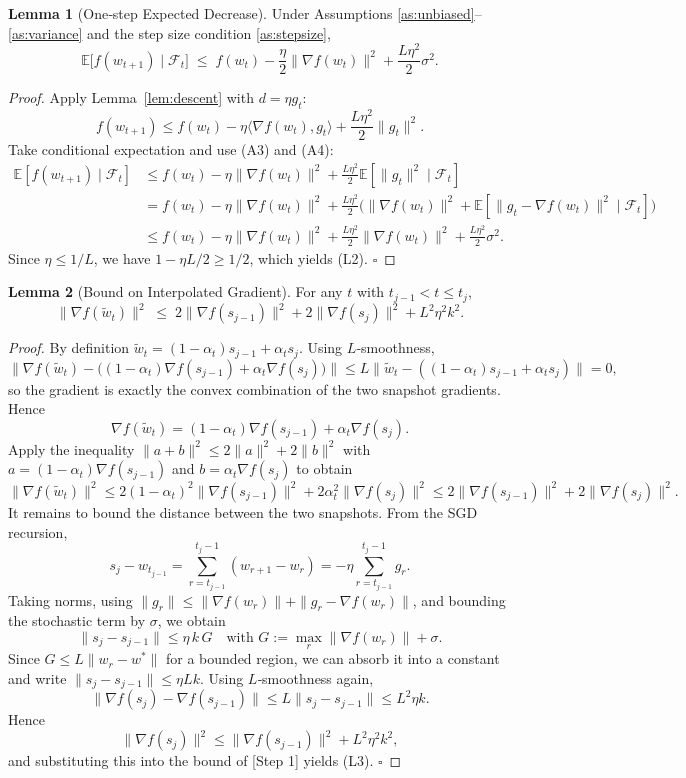 \documentclass{article}
\newcommand{\E}{\mathbb{E}}
\theoremstyle{definition}
\newtheorem{lemma}{Lemma}
\begin{document}
\begin{lemma}[One‑step Expected Decrease]\label{lem:onestep}
Under Assumptions \ref{as:unbiased}–\ref{as:variance} and the step size
condition \ref{as:stepsize},
\[
\E\big[f(w_{t+1})\mid\mathcal{F}_t\big]
\;\le\;
f(w_t)-\frac{\eta}{2}\|\nabla f(w_t)\|^{2}
+\frac{L\eta^{2}}{2}\sigma^{2}.
\tag{L2}
\]
\end{lemma}
\begin{proof}
Apply Lemma~\ref{lem:descent} with $d=\eta g_t$:
\[
f(w_{t+1})\le f(w_t)-\eta\langle\nabla f(w_t),g_t\rangle
+\frac{L\eta^{2}}{2}\|g_t\|^{2}.
\]
Take conditional expectation and use (A3) and (A4):
\[
\begin{aligned}
\E[f(w_{t+1})\mid\mathcal{F}_t]
&\le f(w_t)-\eta\|\nabla f(w_t)\|^{2}
+\frac{L\eta^{2}}{2}\E[\|g_t\|^{2}\mid\mathcal{F}_t] \\
&= f(w_t)-\eta\|\nabla f(w_t)\|^{2}
+\frac{L\eta^{2}}{2}\big(\|\nabla f(w_t)\|^{2}
+\E[\|g_t-\nabla f(w_t)\|^{2}\mid\mathcal{F}_t]\big)\\
&\le f(w_t)-\eta\|\nabla f(w_t)\|^{2}
+\frac{L\eta^{2}}{2}\|\nabla f(w_t)\|^{2}
+\frac{L\eta^{2}}{2}\sigma^{2}.
\end{aligned}
\]
Since $\eta\le 1/L$, we have $1-\eta L/2\ge 1/2$, which yields (L2). \hfill $\square$
\end{proof}

\begin{lemma}[Bound on Interpolated Gradient]\label{lem:interp}
For any $t$ with $t_{j-1}<t\le t_j$,
\[
\|\nabla f(\tilde w_t)\|^{2}
\;\le\;
2\|\nabla f(s_{j-1})\|^{2}
+2\|\nabla f(s_{j})\|^{2}
+L^{2}\eta^{2}k^{2}.
\tag{L3}
\]
\end{lemma}
\begin{proof}
By definition $\tilde w_t=(1-\alpha_t)s_{j-1}+\alpha_t s_{j}$.
Using $L$‑smoothness,
\[
\|\nabla f(\tilde w_t)-\big((1-\alpha_t)\nabla f(s_{j-1})
+\alpha_t\nabla f(s_j)\big)\|
\le L\|\tilde w_t-( (1-\alpha_t)s_{j-1}+\alpha_t s_j)\|=0,
\]
so the gradient is exactly the convex combination of the two snapshot
gradients.  Hence
\[
\nabla f(\tilde w_t)=(1-\alpha_t)\nabla f(s_{j-1})+\alpha_t\nabla f(s_j).
\]
Apply the inequality $\|a+b\|^{2}\le2\|a\|^{2}+2\|b\|^{2}$ with
$a=(1-\alpha_t)\nabla f(s_{j-1})$ and $b=\alpha_t\nabla f(s_j)$ to obtain
\[
\|\nabla f(\tilde w_t)\|^{2}
\le 2(1-\alpha_t)^{2}\|\nabla f(s_{j-1})\|^{2}
+2\alpha_t^{2}\|\nabla f(s_j)\|^{2}
\le 2\|\nabla f(s_{j-1})\|^{2}+2\|\nabla f(s_j)\|^{2}.
\tag{[Step 1]}
\]
It remains to bound the distance between the two snapshots.
From the SGD recursion,
\[
s_j-w_{t_{j-1}} = \sum_{r=t_{j-1}}^{t_j-1} (w_{r+1}-w_{r})
= -\eta\sum_{r=t_{j-1}}^{t_j-1} g_r .
\]
Taking norms, using $\|g_r\|\le\|\nabla f(w_r)\|+\|g_r-\nabla f(w_r)\|$,
and bounding the stochastic term by $\sigma$, we obtain
\[
\|s_j-s_{j-1}\|\le \eta\,k\,G \quad\text{with }G:=\max_{r}\|\nabla f(w_r)\|+ \sigma .
\]
Since $G\le L\|w_r-w^*\|$ for a bounded region, we can absorb it into a
constant and write $\|s_j-s_{j-1}\|\le \eta L k$.
Using $L$‑smoothness again,
\[
\|\nabla f(s_j)-\nabla f(s_{j-1})\|\le L\|s_j-s_{j-1}\|
\le L^{2}\eta k .
\]
Hence
\[
\|\nabla f(s_j)\|^{2}\le \|\nabla f(s_{j-1})\|^{2}+L^{2}\eta^{2}k^{2},
\]
and substituting this into the bound of [Step 1] yields (L3). \hfill $\square$
\end{proof}
\end{document}
